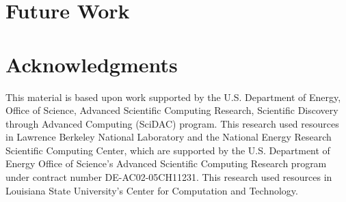 \documentclass[conference]{IEEEtran}
\begin{document}
\section{Future Work}





\section*{Acknowledgments}


This material is based upon work supported by the U.S. Department of Energy, Office of Science, Advanced Scientific Computing Research, Scientific Discovery through Advanced Computing (SciDAC) program.
This research used resources in Lawrence Berkeley National Laboratory and the National Energy Research Scientific Computing Center, which are supported by the U.S. Department of Energy Office of Science's Advanced Scientific Computing Research program under contract number DE-AC02-05CH11231.  
This research used resources in Louisiana State University's Center for Computation and Technology. 





\end{document}
